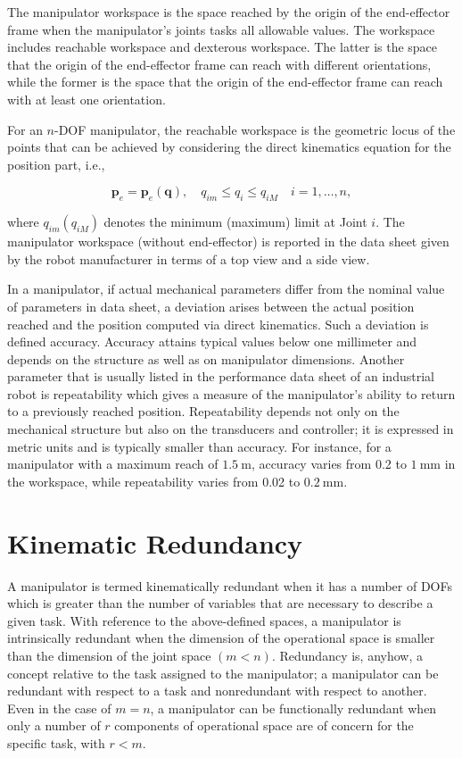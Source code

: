 \documentclass[10pt]{article}
\begin{document}
The manipulator workspace is the space reached by the origin of the end-effector frame when the manipulator's joints tasks all allowable values. The workspace includes reachable workspace and dexterous workspace. The latter is the space that the origin of the end-effector frame can reach with different orientations, while the former is the space that the origin of the end-effector frame can reach with at least one orientation. 

For an $n$-DOF manipulator, the reachable workspace is the geometric locus of the points that can be achieved by considering the direct kinematics equation for the position part, i.e.,

$$
\boldsymbol{p}_{e}=\boldsymbol{p}_{e}(\boldsymbol{q}), \quad q_{i m} \leq q_{i} \leq q_{i M} \quad i=1, \ldots, n,
$$

where $q_{i m}\left(q_{i M}\right)$ denotes the minimum (maximum) limit at Joint $i$. The manipulator workspace (without end-effector) is reported in the data sheet given by the robot manufacturer in terms of a top view and a side view. 


In a manipulator, if actual mechanical parameters differ from the nominal value of  parameters in data sheet, a deviation arises between the actual position reached and the position computed via direct kinematics. Such a deviation is defined accuracy.  Accuracy attains typical values below one millimeter and depends on the structure as well as on manipulator dimensions. Another parameter that is usually listed in the performance data sheet of an industrial robot is repeatability which gives a measure of the manipulator's ability to return to a previously reached position. Repeatability depends not only on the mechanical structure but also on the transducers and controller; it is expressed in metric units and is typically smaller than accuracy. For instance, for a manipulator with a maximum reach of $1.5 \mathrm{~m}$, accuracy varies from 0.2 to $1 \mathrm{~mm}$ in the workspace, while repeatability varies from 0.02 to $0.2 \mathrm{~mm}$.


\section{Kinematic Redundancy}

A manipulator is termed kinematically redundant when it has a number of DOFs which is greater than the number of variables that are necessary to describe a given task. With reference to the above-defined spaces, a manipulator is intrinsically redundant when the dimension of the operational space is smaller than the dimension of the joint space $(m<n)$. Redundancy is, anyhow, a concept relative to the task assigned to the manipulator; a manipulator can be redundant with respect to a task and nonredundant with respect to another. Even in the case of $m=n$, a manipulator can be functionally redundant when only a number of $r$ components of operational space are of concern for the specific task, with $r<m$.
\end{document}
